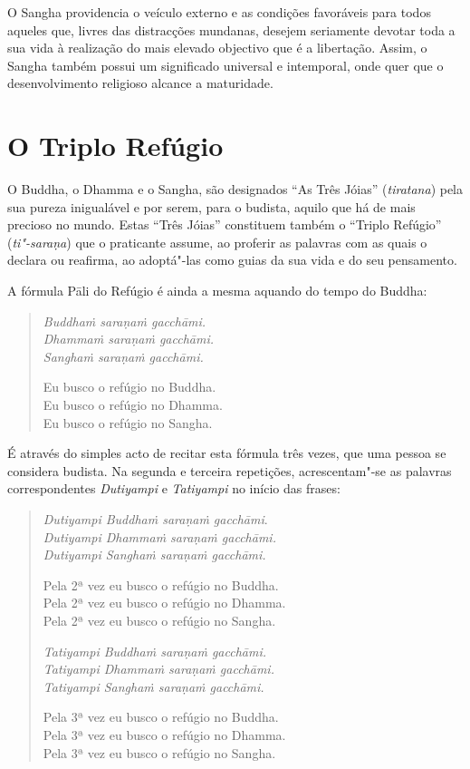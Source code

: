 O Sangha providencia o veículo externo e as condições favoráveis para
todos aqueles que, livres das distracções mundanas, desejem seriamente devotar
toda a sua vida à realização do mais elevado objectivo que é a libertação.
Assim, o Sangha também possui um significado universal e intemporal, onde
quer que o desenvolvimento religioso alcance a maturidade.

\section{O Triplo Refúgio}

O Buddha, o Dhamma e o Sangha, são designados “As Três Jóias”
(\emph{tiratana}) pela sua pureza inigualável e por serem, para o budista,
aquilo que há de mais precioso no mundo. Estas “Três Jóias” constituem também
o “Triplo Refúgio” (\emph{ti"-saraṇa}) que o praticante assume, ao proferir as
palavras com as quais o declara ou reafirma, ao adoptá"-las como guias da sua
vida e do seu pensamento.

A fórmula Pāli do Refúgio é ainda a mesma aquando do tempo do Buddha:

\begin{verse}
  \emph{Buddhaṁ saraṇaṁ gacchāmi.}\\
  \emph{Dhammaṁ saraṇaṁ gacchāmi.}\\
  \emph{Sanghaṁ saraṇaṁ gacchāmi.}

  Eu busco o refúgio no Buddha.\\
  Eu busco o refúgio no Dhamma.\\
  Eu busco o refúgio no Sangha.
\end{verse}

É através do simples acto de recitar esta fórmula três vezes, que uma pessoa se
considera budista. Na segunda e terceira repetições, acrescentam"-se as palavras
correspondentes \emph{Dutiyampi} e \emph{Tatiyampi} no início das frases:

\begin{verse}
  \emph{Dutiyampi Buddhaṁ saraṇaṁ gacchāmi}.\\
  \emph{Dutiyampi Dhammaṁ saraṇaṁ gacchāmi.}\\
  \emph{Dutiyampi Sanghaṁ saraṇaṁ gacchāmi.}

  Pela 2ª vez eu busco o refúgio no Buddha.\\
  Pela 2ª vez eu busco o refúgio no Dhamma.\\
  Pela 2ª vez eu busco o refúgio no Sangha.

  \emph{Tatiyampi Buddhaṁ saraṇaṁ gacchāmi.}\\
  \emph{Tatiyampi Dhammaṁ saraṇaṁ gacchāmi.}\\
  \emph{Tatiyampi Sanghaṁ saraṇaṁ gacchāmi.}

  Pela 3ª vez eu busco o refúgio no Buddha.\\
  Pela 3ª vez eu busco o refúgio no Dhamma.\\
  Pela 3ª vez eu busco o refúgio no Sangha.
\end{verse}

